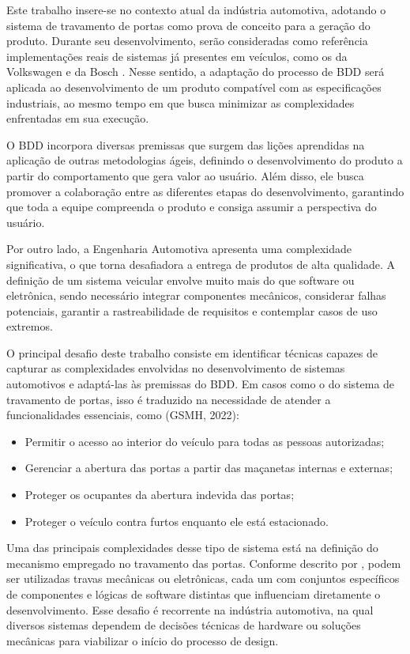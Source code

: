 Este trabalho insere-se no contexto atual da indústria automotiva, adotando o sistema de travamento de portas como prova de conceito para a geração do produto. 
Durante seu desenvolvimento, serão consideradas como referência implementações reais de sistemas já presentes em veículos, como os da Volkswagen \cite{vwLocking} 
e da Bosch \cite{bosch2022handbook,reif2017locking}. Nesse sentido, a adaptação do processo de BDD será aplicada ao desenvolvimento de um produto compatível com 
as especificações industriais, ao mesmo tempo em que busca minimizar as complexidades enfrentadas em sua execução.

O BDD incorpora diversas premissas que surgem das lições aprendidas na aplicação de outras metodologias ágeis, definindo o desenvolvimento do produto a partir do 
comportamento que gera valor ao usuário. Além disso, ele busca promover a colaboração entre as diferentes etapas do desenvolvimento, garantindo que toda a equipe 
compreenda o produto e consiga assumir a perspectiva do usuário.

Por outro lado, a Engenharia Automotiva apresenta uma complexidade significativa, o que torna desafiadora a entrega de produtos de alta qualidade. A definição de 
um sistema veicular envolve muito mais do que software ou eletrônica, sendo necessário integrar componentes mecânicos, considerar falhas 
potenciais, garantir a rastreabilidade de requisitos e contemplar casos de uso extremos.

O principal desafio deste trabalho consiste em identificar técnicas capazes de capturar as complexidades envolvidas no desenvolvimento de sistemas automotivos 
e adaptá-las às premissas do BDD. Em casos como o do sistema de travamento de portas, isso é traduzido na necessidade de atender a funcionalidades 
essenciais, como (GSMH, 2022):

\begin{itemize}
    \item Permitir o acesso ao interior do veículo para todas as pessoas autorizadas;
    \item Gerenciar a abertura das portas a partir das maçanetas internas e externas;
    \item Proteger os ocupantes da abertura indevida das portas;
    \item Proteger o veículo contra furtos enquanto ele está estacionado.
\end{itemize}

Uma das principais complexidades desse tipo de sistema está na definição do mecanismo empregado no travamento das portas. Conforme descrito por 
, podem ser utilizadas travas mecânicas ou eletrônicas, cada um com conjuntos específicos de componentes e lógicas de 
software distintas que influenciam diretamente o desenvolvimento. Esse desafio é recorrente na indústria automotiva, na qual diversos sistemas dependem 
de decisões técnicas de hardware ou soluções mecânicas para viabilizar o início do processo de design.

